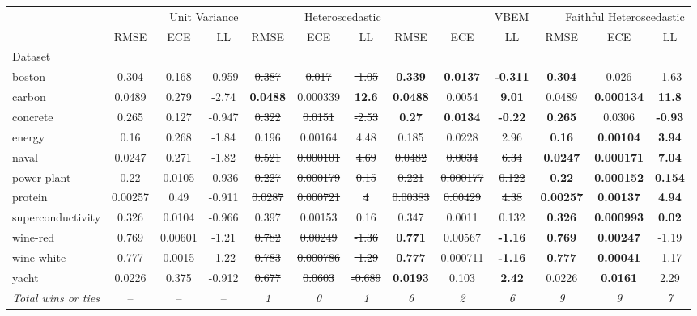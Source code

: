 \begin{tabular}{l|ccc|ccc|ccc|ccc}
\toprule
{} & \multicolumn{3}{r}{Unit Variance} & \multicolumn{3}{r}{Heteroscedastic} & \multicolumn{3}{r}{VBEM} & \multicolumn{3}{r}{Faithful Heteroscedastic} \\
{} & {RMSE} & {ECE} & {LL} & {RMSE} & {ECE} & {LL} & {RMSE} & {ECE} & {LL} & {RMSE} & {ECE} & {LL} \\
{Dataset} & {} & {} & {} & {} & {} & {} & {} & {} & {} & {} & {} & {} \\
\midrule
boston & 0.304 & 0.168 & -0.959 & \sout{0.387} & \sout{0.017} & \sout{-1.05} & \textbf{0.339} & \textbf{0.0137} & \textbf{-0.311} & \textbf{0.304} & 0.026 & -1.63 \\
carbon & 0.0489 & 0.279 & -2.74 & \textbf{0.0488} & 0.000339 & \textbf{12.6} & \textbf{0.0488} & 0.0054 & \textbf{9.01} & 0.0489 & \textbf{0.000134} & \textbf{11.8} \\
concrete & 0.265 & 0.127 & -0.947 & \sout{0.322} & \sout{0.0151} & \sout{-2.53} & \textbf{0.27} & \textbf{0.0134} & \textbf{-0.22} & \textbf{0.265} & 0.0306 & \textbf{-0.93} \\
energy & 0.16 & 0.268 & -1.84 & \sout{0.196} & \sout{0.00164} & \sout{4.48} & \sout{0.185} & \sout{0.0228} & \sout{2.96} & \textbf{0.16} & \textbf{0.00104} & \textbf{3.94} \\
naval & 0.0247 & 0.271 & -1.82 & \sout{0.521} & \sout{0.000101} & \sout{4.69} & \sout{0.0482} & \sout{0.0034} & \sout{6.34} & \textbf{0.0247} & \textbf{0.000171} & \textbf{7.04} \\
power plant & 0.22 & 0.0105 & -0.936 & \sout{0.227} & \sout{0.000179} & \sout{0.15} & \sout{0.221} & \sout{0.000177} & \sout{0.122} & \textbf{0.22} & \textbf{0.000152} & \textbf{0.154} \\
protein & 0.00257 & 0.49 & -0.911 & \sout{0.0287} & \sout{0.000721} & \sout{4} & \sout{0.00383} & \sout{0.00429} & \sout{4.38} & \textbf{0.00257} & \textbf{0.00137} & \textbf{4.94} \\
superconductivity & 0.326 & 0.0104 & -0.966 & \sout{0.397} & \sout{0.00153} & \sout{0.16} & \sout{0.347} & \sout{0.0011} & \sout{0.132} & \textbf{0.326} & \textbf{0.000993} & \textbf{0.02} \\
wine-red & 0.769 & 0.00601 & -1.21 & \sout{0.782} & \sout{0.00249} & \sout{-1.36} & \textbf{0.771} & 0.00567 & \textbf{-1.16} & \textbf{0.769} & \textbf{0.00247} & -1.19 \\
wine-white & 0.777 & 0.0015 & -1.22 & \sout{0.783} & \sout{0.000786} & \sout{-1.29} & \textbf{0.777} & 0.000711 & \textbf{-1.16} & \textbf{0.777} & \textbf{0.00041} & -1.17 \\
yacht & 0.0226 & 0.375 & -0.912 & \sout{0.677} & \sout{0.0603} & \sout{-0.689} & \textbf{0.0193} & 0.103 & \textbf{2.42} & 0.0226 & \textbf{0.0161} & 2.29 \\
\textit{{Total wins or ties}} & -- & -- & -- & \textit{1} & \textit{0} & \textit{1} & \textit{6} & \textit{2} & \textit{6} & \textit{9} & \textit{9} & \textit{7} \\
\bottomrule
\end{tabular}

